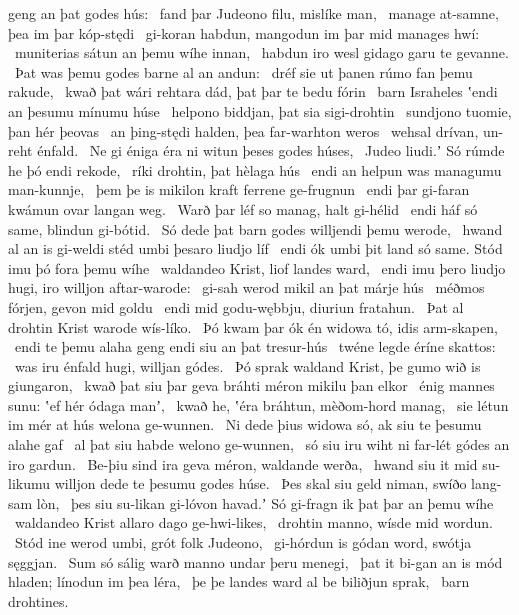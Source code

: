 geng an þat godes hús: \hld\ fand þar Judeono filu,
mislíke man, \hld\ manage at-samne,
þea im þar kóp-stędi \hld\ gi-koran habdun,
mangodun im þar mid manages hwí: \hld\ muniterias sátun
an þemu wíhe innan, \hld\ habdun iro wesl gidago
garu te gevanne. \hld\ Þat was þemu godes barne
al an andun: \hld\ dréf sie ut þanen
rúmo fan þemu rakude, \hld\ kwað þat wári rehtara dád,
þat þar te bedu fórin \hld\ barn Israheles
ʽendi an þesumu mínumu húse \hld\ helpono biddjan,
þat sia sigi-drohtin \hld\ sundjono tuomie,
þan hér þeovas \hld\ an þing-stędi halden,
þea far-warhton weros \hld\ wehsal drívan,
un-reht énfald. \hld\ Ne gi éniga éra ni witun
þeses godes húses, \hld\ Judeo liudi.ʼ
Só rúmde he þó endi rekode, \hld\ ríki drohtin,
þat hèlaga hús \hld\ endi an helpun was
managumu man-kunnje, \hld\ þem þe is mikilon kraft
ferrene ge-frugnun \hld\ endi þar gi-faran kwámun
ovar langan weg. \hld\ Warð þar léf so manag,
halt gi-hélid \hld\ endi háf só same,
blindun gi-bótid. \hld\ Só dede þat barn godes
willjendi þemu werode, \hld\ hwand al an is gi-weldi stéd
umbi þesaro liudjo líf \hld\ endi ók umbi þit land só same.
Stód imu þó fora þemu wíhe \hld\ waldandeo Krist,
liof landes ward, \hld\ endi imu þero liudjo hugi,
iro willjon aftar-warode: \hld\ gi-sah werod mikil
an þat márje hús \hld\ méðmos fórjen,
gevon mid goldu \hld\ endi mid godu-wębbju,
diuriun fratahun. \hld\ Þat al drohtin Krist
warode wís-líko. \hld\ Þó kwam þar ók én widowa tó,
idis arm-skapen, \hld\ endi te þemu alaha geng
endi siu an þat tresur-hús \hld\ twéne legde
éríne skattos: \hld\ was iru énfald hugi,
willjan gódes. \hld\ Þó sprak waldand Krist,
þe gumo wið is giungaron, \hld\ kwað þat siu þar geva bráhti
méron mikilu þan elkor \hld\ énig mannes sunu:
ʽef hér ódaga manʼ, \hld\ kwað he, ʽéra bráhtun,
mèðom-hord manag, \hld\ sie létun im mér at hús
welona ge-wunnen. \hld\ Ni dede þius widowa só,
ak siu te þesumu alahe gaf \hld\ al þat siu habde
welono ge-wunnen, \hld\ só siu iru wiht ni far-lét
gódes an iro gardun. \hld\ Be-þiu sind ira geva méron,
waldande werða, \hld\ hwand siu it mid su-likumu willjon dede
te þesumu godes húse. \hld\ Þes skal siu geld niman,
swíðo lang-sam lòn, \hld\ þes siu su-likan gi-lóvon havad.ʼ
Só gi-fragn ik þat þar an þemu wíhe \hld\ waldandeo Krist
allaro dago ge-hwi-likes, \hld\ drohtin manno,
wísde mid wordun. \hld\ Stód ine werod umbi,
grót folk Judeono, \hld\ gi-hórdun is gódan word,
swótja sęggjan. \hld\ Sum só sálig warð
manno undar þeru menegi, \hld\ þat it bi-gan an is mód hladen;
línodun im þea léra, \hld\ þe þe landes ward
al be biliðjun sprak, \hld\ barn drohtines.
